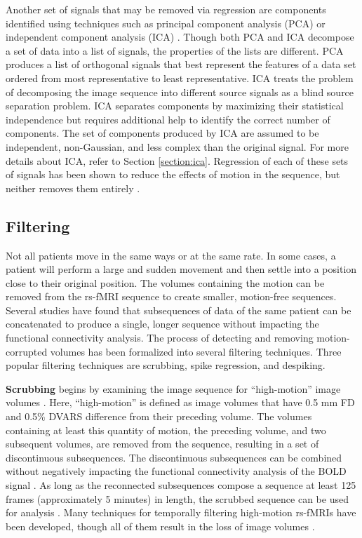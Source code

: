 Another set of signals that may be removed via regression are components identified using techniques such as principal component analysis (PCA) or independent component analysis (ICA) \cite{Pruim2015} \cite{Salimi-Khorshidi2014} \cite{Behzadi2007}. Though both PCA and ICA decompose a set of data into a list of signals, the properties of the lists are different. PCA produces a list of orthogonal signals that best represent the features of a data set ordered from most representative to least representative. ICA treats the problem of decomposing the image sequence into different source signals as a blind source separation problem. ICA separates components by maximizing their statistical independence but requires additional help to identify the correct number of components. The set of components produced by ICA are assumed to be independent, non-Gaussian, and less complex than the original signal. For more details about ICA, refer to Section \ref{section:ica}. Regression of each of these sets of signals has been shown to reduce the effects of motion in the sequence, but neither removes them entirely \cite{Power2015} \cite{Parkes2017}. 

\subsection{Filtering}

Not all patients move in the same ways or at the same rate. In some cases, a patient will perform a large and sudden movement and then settle into a position close to their original position. The volumes containing the motion can be removed from the rs-fMRI sequence to create smaller, motion-free sequences. Several studies have found that subsequences of data of the same patient can be concatenated to produce a single, longer sequence without impacting the functional connectivity analysis. The process of detecting and removing motion-corrupted volumes has been formalized into several filtering techniques. 
Three popular filtering techniques are scrubbing, spike regression, and despiking. 

\textbf{Scrubbing} begins by examining the image sequence for ``high-motion'' image volumes \cite{Power2012}. Here, ``high-motion'' is defined as image volumes that have 0.5 mm FD and 0.5\% DVARS difference from their preceding volume. The volumes containing at least this quantity of motion, the preceding volume, and two subsequent volumes, are removed from the sequence, resulting in a set of discontinuous subsequences. The discontinuous subsequences can be combined without negatively impacting the functional connectivity analysis of the BOLD signal \cite{Fair2007} \cite{VanDijk2010}. As long as the reconnected subsequences compose a sequence at least 125 frames (approximately 5 minutes) in length, the scrubbed sequence can be used for analysis \cite{Power2012}. Many techniques for temporally filtering high-motion rs-fMRIs have been developed,  though all of them result in the loss of image volumes \cite{Barnes2011} \cite{Fransson2007} \cite{Jones2010} \cite{Kennedy2008} \cite{Smyser2010} \cite{Smyser2011}.  

